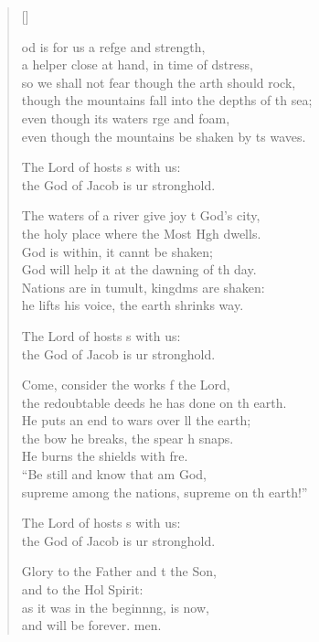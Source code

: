 \settowidth{\versewidth}{though the mountains fall into the depths of the sea;}
\begin{verse}[\versewidth]
  \begin{patverse}
od is for us a refge and strength,\Med\\
a helper close at hand, in time of dstress,\\
so we shall not fear though the arth should rock,\Med\\
though the mountains fall into the depths of th sea;\\
even though its waters rge and foam,\Med\\
even though the mountains be shaken by ts waves.

The Lord of hosts s with us:\Med\\
the God of Jacob is ur stronghold.

The waters of a river give joy t God’s city,\Med\\
the holy place where the Most Hgh dwells.\\
God is within, it cannt be shaken;\Med\\
God will help it at the dawning of th day.\\
Nations are in tumult, kingdms are shaken:\Med\\
he lifts his voice, the earth shrinks way.

The Lord of hosts s with us:\Med\\
the God of Jacob is ur stronghold.

Come, consider the works f the Lord,\Med\\
the redoubtable deeds he has done on th earth.\\
He puts an end to wars over ll the earth;\Med\\
the bow he breaks, the spear h snaps.\\
He burns the shields with fre.\Flex\\
“Be still and know that  am God,\Med\\
supreme among the nations, supreme on th earth!”

The Lord of hosts s with us:\Med\\
the God of Jacob is ur stronghold.

Glory to the Father and t the Son,\Med\\
and to the Hol Spirit:\\
as it was in the beginnng, is now,\Med\\
and will be forever. men. 
  \end{patverse}
\end{verse}
